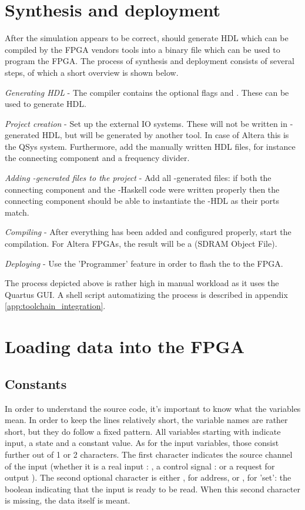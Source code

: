 \section{Synthesis and deployment}
After the simulation appears to be correct, \clash{} should generate HDL which can be compiled by the FPGA vendors tools into a binary file which can be used to program the FPGA. The process of synthesis and deployment consists of several steps, of which a short overview is shown below.
\begin{enumeratens}
	\item \emph{Generating HDL } - The \clash{} compiler contains the optional flags  and . These can be used to generate HDL.
	\item \emph{Project creation} - Set up the external IO systems. These will not be written in \clash{}-generated HDL, but will be generated by another tool. In case of Altera this is the QSys system. Furthermore, add the manually written HDL files, for instance the connecting component and a frequency divider.
	\item \emph{Adding \clash{}-generated files to the project} - Add all \clash{}-generated files: if both the connecting component and the \clash{}-Haskell code were written properly then the connecting component should be able to instantiate the \clash{}-HDL as their ports match.
	\item \emph{Compiling} - After everything has been added and configured properly, start the compilation. For Altera FPGAs, the result will be a  (SDRAM Object File). 
	\item \emph{Deploying} - Use the 'Programmer' feature in order to flash the  to the FPGA.
\end{enumeratens}

The process depicted above is rather high in manual workload as it uses the Quartus GUI. A shell script automatizing the process is described in appendix \ref{app:toolchain_integration}.  

\section{Loading data into the FPGA}
\subsection{Constants}
In order to understand the \clash{} source code, it's important to know what the variables mean. In order to keep the lines relatively short, the variable names are rather short, but they do follow a fixed pattern. All variables starting with  indicate input,  a state and  a constant value. As for the input variables, those consist further out of 1 or 2 characters. The first character indicates the source channel of the input (whether it is a real input : , a control signal :  or a request for output ). The second optional character is either , for address, or , for 'set': the boolean indicating that the input is ready to be read. When this second character is missing, the data itself is meant.

